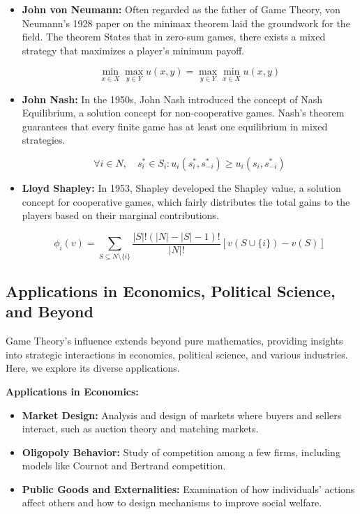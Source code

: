 \documentclass[12pt]{book} %
\begin{document}
\begin{itemize}
    \item \textbf{John von Neumann:} Often regarded as the father of Game Theory, von Neumann's 1928 paper on the minimax theorem laid the groundwork for the field. The theorem States that in zero-sum games, there exists a mixed strategy that maximizes a player's minimum payoff.

    \[
    \min_{x \in X} \max_{y \in Y} u(x, y) = \max_{y \in Y} \min_{x \in X} u(x, y)
    \]

    \item \textbf{John Nash:} In the 1950s, John Nash introduced the concept of Nash Equilibrium, a solution concept for non-cooperative games. Nash's theorem guarantees that every finite game has at least one equilibrium in mixed strategies.

    \[
    \forall i \in N, \quad s_i^* \in S_i : u_i(s_i^*, s_{-i}^*) \geq u_i(s_i, s_{-i}^*)
    \]

    \item \textbf{Lloyd Shapley:} In 1953, Shapley developed the Shapley value, a solution concept for cooperative games, which fairly distributes the total gains to the players based on their marginal contributions.

    \[
    \phi_i(v) = \sum_{S \subseteq N \setminus \{i\}} \frac{|S|!(|N|-|S|-1)!}{|N|!} [v(S \cup \{i\}) - v(S)]
    \]

\end{itemize}

\subsection{Applications in Economics, Political Science, and Beyond}

Game Theory's influence extends beyond pure mathematics, providing insights into strategic interactions in economics, political science, and various industries. Here, we explore its diverse applications.

\textbf{Applications in Economics:}

\begin{itemize}
    \item \textbf{Market Design:} Analysis and design of markets where buyers and sellers interact, such as auction theory and matching markets.
    \item \textbf{Oligopoly Behavior:} Study of competition among a few firms, including models like Cournot and Bertrand competition.
    \item \textbf{Public Goods and Externalities:} Examination of how individuals' actions affect others and how to design mechanisms to improve social welfare.
\end{itemize}
\end{document}
